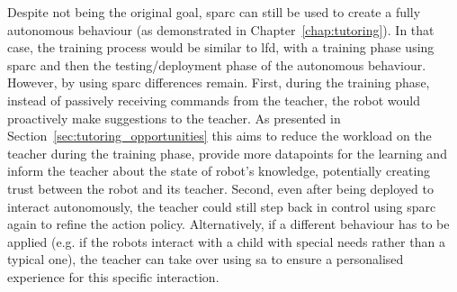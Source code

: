 Despite not being the original goal, \gls{sparc} can still be used to create a fully autonomous behaviour (as demonstrated in Chapter~\ref{chap:tutoring}). In that case, the training process would be similar to \gls{lfd}, with a training phase using \gls{sparc} and then the testing/deployment phase of the autonomous behaviour. However, by using \gls{sparc} differences remain. First, during the training phase, instead of passively receiving commands from the teacher, the robot would proactively make suggestions to the teacher. As presented in Section~\ref{sec:tutoring_opportunities} this aims to reduce the workload on the teacher during the training phase, provide more datapoints for the learning and inform the teacher about the state of robot's knowledge, potentially creating trust between the robot and its teacher. Second, even after being deployed to interact autonomously, the teacher could still step back in control using \gls{sparc} again to refine the action policy. Alternatively, if a different behaviour has to be applied (e.g. if the robots interact with a child with special needs rather than a typical one), the teacher can take over using \gls{sa} to ensure a personalised experience for this specific interaction.

